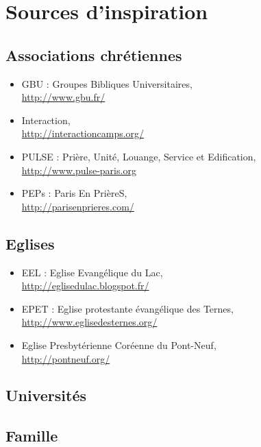 \section{Sources d'inspiration}

	\subsection{Associations chrétiennes}
	
	\begin{itemize}
	\item GBU : Groupes Bibliques Universitaires,\\
		\url{http://www.gbu.fr/}
	\item Interaction,\\
		\url{http://interactioncamps.org/}
	\item PULSE : Prière, Unité, Louange, Service et Edification,\\
		\url{http://www.pulse-paris.org}
	\item PEPs : Paris En PrièreS,\\
		\url{http://parisenprieres.com/}
	\end{itemize}
	
	\subsection{Eglises}
	
	\begin{itemize}
	\item EEL : Eglise Evangélique du Lac,\\
		\url{http://eglisedulac.blogspot.fr/}
	\item EPET : Eglise protestante évangélique des Ternes,\\
		\url{http://www.eglisedesternes.org/} %
	\item Eglise Presbytérienne Coréenne du Pont-Neuf,\\
		\url{http://pontneuf.org/}
	\end{itemize}
	
	\subsection{Universités}
	
	
	\subsection{Famille}
	
